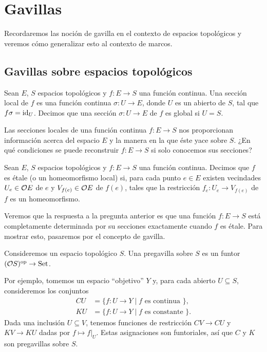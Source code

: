 \chapter{Gavillas}

Recordaremos las noción de gavilla en el contexto
de espacios topológicos y veremos cómo generalizar esto
al contexto de marcos.

\section{Gavillas sobre espacios topológicos}

\begin{defn}
    Sean $E$, $S$ espacios topológicos
    y $f:E\to S$ una función continua.
    Una sección local de $f$ es una función continua $\sigma:U\to E$,
    donde $U$ es un abierto de $S$, tal que $f\sigma=\id_U$.
    Decimos que una sección $\sigma:U\to E$ de $f$ es global si $U=S$.
\end{defn}

Las secciones locales de una función continua $f:E\to S$
nos proporcionan información acerca del espacio $E$
y la manera en la que éste yace sobre $S$.
¿En qué condiciones se puede reconstruir $f:E\to S$ si solo
conocemos sus secciones?

\begin{defn}
    Sean $E$, $S$ espacios topológicos
    y $f:E\to S$ una función continua.
    Decimos que $f$ es étale (o un homeomorfismo local) si,
    para cada punto $e\in E$ existen vecindades
    $U_e\in\cal OE$ de $e$ y $V_{f(e)}\in\cal OE$ de $f(e)$,
    tales que la restricción
    $f_e:U_e\to V_{f(e)}$ de $f$ es un homeomorfismo.
\end{defn}

Veremos que la respuesta a la pregunta anterior
es que una función $f:E\to S$ está completamente determinada
por su secciones exactamente cuando $f$ es étale.
Para mostrar esto, pasaremos por el concepto de gavilla.

\begin{defn}
    Consideremos un espacio topológico $S$.
    Una pregavilla sobre $S$ es un funtor $(\cal OS)^\op\to\Con$.
\end{defn}

Por ejemplo, tomemos un espacio ``objetivo'' $Y$ y,
para cada abierto $U\subseteq S$,
consideremos los conjuntos
\begin{align*}
    CU &= \{f:U\to Y\mid f \text{ es continua }\}, \\
    KU &= \{f:U\to Y\mid f \text{ es constante }\}.
\end{align*}
Dada una inclusión $U\subseteq V$,
tenemos funciones de restricción $CV\to CU$ y $KV\to KU$
dadas por $f\mapsto f|_U$.
Estas asignaciones son funtoriales,
así que $C$ y $K$ son pregavillas sobre $S$.

